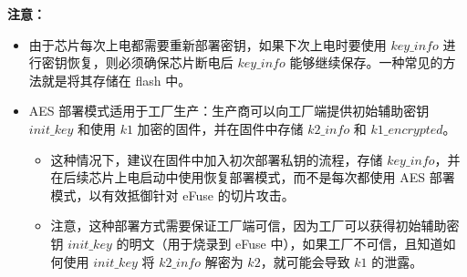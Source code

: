 \documentclass[main\_\_CN.tex]{subfiles}
\begin{document}
\textbf{注意：}\\
\begin{itemize}
    \item 由于芯片每次上电都需要重新部署密钥，如果下次上电时要使用 \hyperref[para:keyinfo]{\begin{math}key\_info\end{math}} 进行密钥恢复，则必须确保芯片断电后 \hyperref[para:keyinfo]{\begin{math}key\_info\end{math}} 能够继续保存。一种常见的方法就是将其存储在 flash 中。
    \item AES 部署模式适用于工厂生产：生产商可以向工厂端提供初始辅助密钥 \hyperref[para:initkey]{\begin{math}init\_key\end{math}} 
    和使用 \hyperref[para:k1]{\begin{math}k1\end{math}} 加密的固件，并在固件中存储 \hyperref[para:k2info]{\begin{math}k2\_info\end{math}} 和 \hyperref[para:k1enc]{\begin{math}k1\_encrypted\end{math}}。
    \begin{itemize}
        \item 这种情况下，建议在固件中加入初次部署私钥的流程，存储 \hyperref[para:keyinfo]{\begin{math}key\_info\end{math}}，并在后续芯片上电启动中使用恢复部署模式，而不是每次都使用 AES 部署模式，以有效抵御针对 eFuse 的切片攻击。
        \item 注意，这种部署方式需要保证工厂端可信，因为工厂可以获得初始辅助密钥 \hyperref[para:initkey]{\begin{math}init\_key\end{math}} 的明文（用于烧录到 eFuse 中），如果工厂不可信，且知道如何使用 \hyperref[para:initkey]{\begin{math}init\_key\end{math}} 将 \hyperref[para:k2info]{\begin{math}k2\_info\end{math}} 解密为 \hyperref[para:k2]{\begin{math}k2\end{math}}，就可能会导致 \hyperref[para:k1]{\begin{math}k1\end{math}} 的泄露。
    \end{itemize}

\end{itemize}
\end{document}
